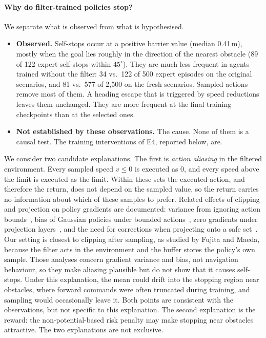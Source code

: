 \documentclass[11pt]{article}
\theoremstyle{definition}
\theoremstyle{remark}
\begin{document}
\paragraph{Why do filter-trained policies stop?} We separate what is observed from what is hypothesised.
\begin{itemize}
  \item \textbf{Observed.} Self-stops occur at a positive barrier value (median 0.41\,m), mostly when the goal lies roughly in the direction of the nearest obstacle (89 of 122 expert self-stops within $45^\circ$). They are much less frequent in agents trained without the filter: 34 vs.\ 122 of 500 expert episodes on the original scenarios, and 81 vs.\ 577 of 2{,}500 on the fresh scenarios. Sampled actions remove most of them. A heading escape that is triggered by speed reductions leaves them unchanged. They are more frequent at the final training checkpoints than at the selected ones.
  \item \textbf{Not established by these observations.} The cause. None of them is a causal test. The training interventions of E4, reported below, are.
\end{itemize}
We consider two candidate explanations. The first is \emph{action aliasing} in the filtered environment. Every sampled speed $v\le0$ is executed as $0$, and every speed above the limit is executed as the limit. Within these sets the executed action, and therefore the return, does not depend on the sampled value, so the return carries no information about which of these samples to prefer. Related effects of clipping and projection on policy gradients are documented: variance from ignoring action bounds~\cite{fujita2018capg}, bias of Gaussian policies under bounded actions~\cite{chou2017beta}, zero gradients under projection layers~\cite{lin2021zerogradient}, and the need for corrections when projecting onto a safe set~\cite{gros2020projection}. Our setting is closest to clipping after sampling, as studied by Fujita and Maeda, because the filter acts in the environment and the buffer stores the policy's own sample. Those analyses concern gradient variance and bias, not navigation behaviour, so they make aliasing plausible but do not show that it causes self-stops. Under this explanation, the mean could drift into the stopping region near obstacles, where forward commands were often truncated during training, and sampling would occasionally leave it. Both points are consistent with the observations, but not specific to this explanation. The second explanation is the reward: the non-potential-based risk penalty may make stopping near obstacles attractive. The two explanations are not exclusive.
\end{document}
